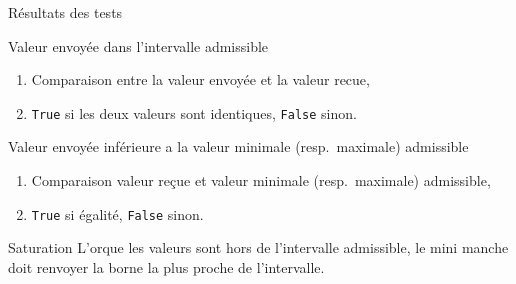 \documentclass[footheight=2em]{beamer}
\begin{document}
\begin{frame}[t]{Résultats des tests}
  \begin{block}{Valeur envoyée dans l'intervalle admissible}
    \begin{enumerate}
      \item Comparaison entre la valeur envoyée et la valeur recue,
      \item \texttt{True} si les deux valeurs sont identiques, \texttt{False}
        sinon.
    \end{enumerate}
  \end{block}
  \begin{block}{Valeur envoyée inférieure a la valeur minimale (resp.\
      maximale) admissible}
    \begin{enumerate}
      \item Comparaison valeur reçue et valeur minimale (resp.\ maximale)
        admissible,
      \item \texttt{True} si égalité, \texttt{False} sinon.
    \end{enumerate}
  \end{block}
  \begin{block}{Saturation}
    L'orque les valeurs sont hors de l'intervalle admissible, le mini manche doit
    renvoyer la borne la plus proche de l'intervalle.
  \end{block}
\end{frame}
\end{document}

